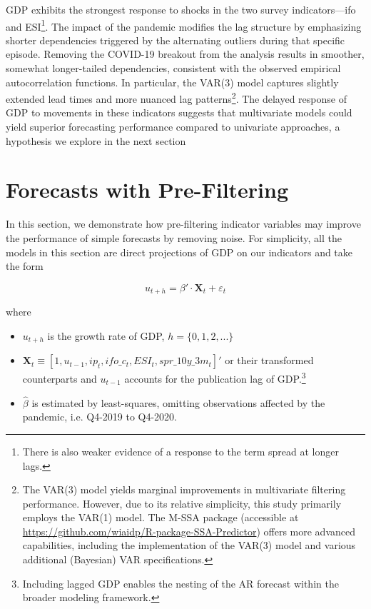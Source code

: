 \documentclass[11pt,a4paper]{article}
\begin{document}
GDP exhibits the strongest response to shocks in the two survey indicators—ifo and ESI\footnote{There is also weaker evidence of a response to the term spread at longer lags.}. The impact of the pandemic modifies the lag structure by emphasizing shorter dependencies triggered by the alternating outliers during that specific episode. Removing the COVID-19 breakout from the analysis results in smoother, somewhat longer-tailed dependencies, consistent with the observed empirical autocorrelation functions. In particular, the VAR(3) model captures slightly extended lead times and more nuanced lag patterns\footnote{The VAR(3) model yields marginal improvements in multivariate filtering performance. However, due to its relative simplicity, this study primarily employs the VAR(1) model. The M-SSA package (accessible at \url{https://github.com/wiaidp/R-package-SSA-Predictor}) offers more advanced capabilities, including the implementation of the VAR(3) model and various additional (Bayesian) VAR specifications.}. The delayed response of GDP to movements in these indicators suggests that multivariate models could yield superior forecasting performance compared to univariate approaches, a hypothesis we explore in the next section


\section{Forecasts with Pre-Filtering}\label{sec:direct_forecast}

In this section, we demonstrate how pre-filtering indicator variables may improve the performance of simple forecasts by removing noise. For simplicity, all the models in this section are direct projections of GDP on our indicators and take the form

\begin{equation}
    u_{t+h} = \beta' \cdot \mathbf{X}_t + \varepsilon_t
    \label{eq:direct_forecast}
\end{equation}

where
\begin{itemize}
    \item $u_{t+h}$ is the growth rate of GDP, $h = \{0, 1, 2, ... \}$
    \item $\mathbf{X}_t \equiv [1,u_{t-1}, ip_t, ifo\_c_t, ESI_t, spr\_10y\_3m_t]'$ or their transformed counterparts and $u_{t-1}$ accounts for the publication lag of GDP.\footnote{Including lagged GDP enables the nesting of the AR forecast within the broader modeling framework.}
    \item $\hat{\beta}$ is estimated by least-squares, omitting observations affected by the pandemic, i.e. Q4-2019 to Q4-2020.
\end{itemize}
\end{document}
